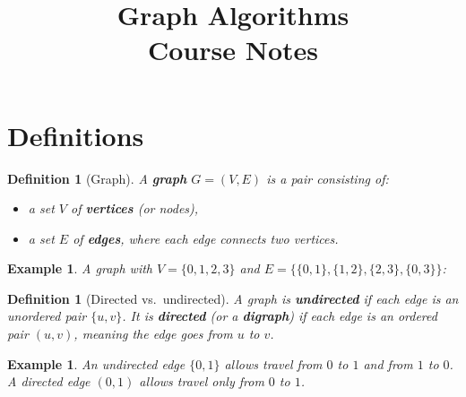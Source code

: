 \documentclass[11pt,a4paper]{article}
\title{\textbf{Graph Algorithms}\\
\large Course Notes}
\author{}
\date{}
\newtheorem{definition}[theorem]{Definition}
\newtheorem{example}[theorem]{Example}
\begin{document}
\maketitle

\tableofcontents
\newpage

\section{Definitions}

\begin{definition}[Graph]
A \textbf{graph} $G = (V, E)$ is a pair consisting of:
\begin{itemize}
    \item a set $V$ of \textbf{vertices} (or nodes),
    \item a set $E$ of \textbf{edges}, where each edge connects two vertices.
\end{itemize}
\end{definition}

\begin{example}
A graph with $V = \{0, 1, 2, 3\}$ and $E = \{\{0,1\}, \{1,2\}, \{2,3\}, \{0,3\}\}$:
\begin{center}
\end{center}
\end{example}

\begin{definition}[Directed vs.\ undirected]
A graph is \textbf{undirected} if each edge is an unordered pair $\{u, v\}$. It is \textbf{directed} (or a \textbf{digraph}) if each edge is an ordered pair $(u, v)$, meaning the edge goes from $u$ to $v$.
\end{definition}

\begin{example}
An undirected edge $\{0, 1\}$ allows travel from $0$ to $1$ and from $1$ to $0$. A directed edge $(0, 1)$ allows travel only from $0$ to $1$.
\begin{center}
\end{center}
\end{example}
\end{document}
